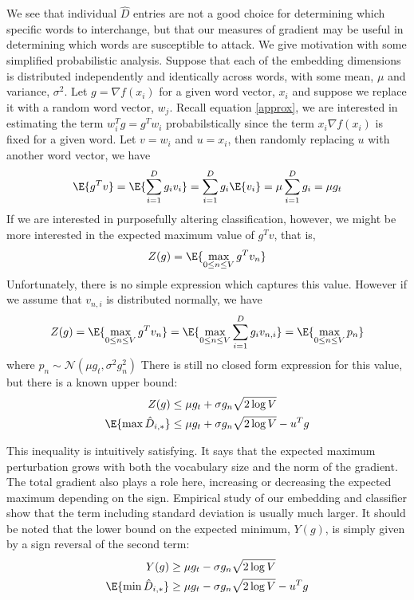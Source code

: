We see that individual $\hat{D}$ entries are not a good choice for determining which specific words to interchange, but that our measures of gradient may be useful in determining which words are susceptible to attack.  We give motivation with some simplified probabilistic analysis.  Suppose that each of the embedding dimensions is distributed independently and identically across words, with some mean, $\mu$ and variance, $\sigma^2$.  Let $g = \nabla f(x_i)$ for a given word vector, $x_i$ and suppose we replace it with a random word vector, $w_j$.  Recall equation \ref{approx}, we are interested in estimating the term $w_i^Tg = g^Tw_i$ probabilstically since the term $x_i\nabla f(x_i)$ is fixed for a given word.  Let $v=w_i$ and $u=x_i$, then randomly replacing $u$ with another word vector, we have
\begin{equation}
\E{g^Tv} = \E{\sum_{i=1}^D{g_iv_i}} = \sum_{i=1}^D{g_i\E{v_i}} = \mu\sum_{i=1}^D{g_i} = \mu g_t
\end{equation}
\noindent
If we are interested in purposefully altering classification, however, we might be more interested in the expected maximum value of $g^Tv$, that is,
\begin{equation}
Z(g) = \E{\underset{0\leq n\leq V}{\max}\,{g^Tv_n}}
\end{equation}
\noindent
Unfortunately, there is no simple expression which captures this value.  However if we assume that $v_{n,i}$ is distributed normally, we have 
\begin{equation}
Z(g) = \E{\underset{0\leq n\leq V}{\max}\,{g^Tv_n}} = \E{\underset{0\leq n\leq V}{\max}\,{\sum_{i=1}^D{g_i}v_{n,i}}} = \E{\underset{0\leq n\leq V}{\max}\,{p_n}}
\end{equation}
\noindent
where $p_n \sim \mathcal{N}(\mu g_t,\sigma^2 g_n^2)$  There is still no closed form expression for this value, but there is a known \cite{pm07} upper bound:
\begin{align}
Z(g) &\leq \mu g_t + \sigma g_n\sqrt{2\log{V}}\\
\E{\max \hat{D}_{i,*}} &\leq \mu g_t + \sigma g_n\sqrt{2\log{V}} -u^Tg
\end{align}

\noindent
This inequality is intuitively satisfying.  It says that the expected maximum perturbation grows with both the vocabulary size and the norm of the gradient.  The total gradient also plays a role here, increasing or decreasing the expected maximum depending on the sign.  Empirical study of our embedding and classifier show that the term including standard deviation is usually much larger.  It should be noted that the lower bound on the expected minimum, $Y(g)$, is simply given by a sign reversal of the second term:
\begin{align}
Y(g) &\geq \mu g_t - \sigma g_n\sqrt{2\log{V}} \\
\E{\min \hat{D}_{i,*}} &\geq \mu g_t - \sigma g_n\sqrt{2\log{V}} - u^Tg
\end{align}

